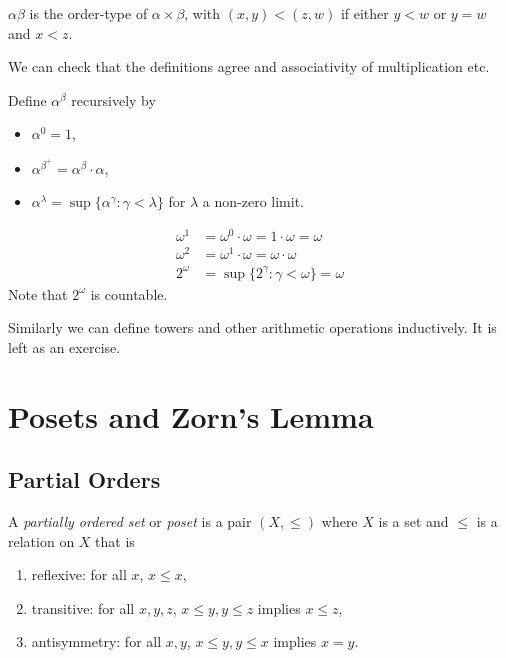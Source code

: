 \documentclass[a4paper]{article}
\begin{document}
\begin{definition}
  \(\alpha\beta\) is the order-type of \(\alpha \times \beta\), with \((x, y) < (z, w)\) if either \(y < w\) or \(y = w\) and \(x < z\).
\end{definition}

We can check that the definitions agree and associativity of multiplication etc.

\begin{definition}
  Define \(\alpha^\beta\) recursively by
  \begin{itemize}
  \item \(\alpha^0 = 1\),
  \item \(\alpha^{\beta^+} = \alpha^\beta \cdot \alpha\),
  \item \(\alpha^\lambda = \sup\{\alpha^\gamma: \gamma < \lambda\}\) for \(\lambda\) a non-zero limit.
  \end{itemize}
\end{definition}

\begin{eg}
  \begin{align*}
    \omega^1 &= \omega^0 \cdot \omega = 1 \cdot \omega = \omega \\
    \omega^2 &= \omega^1 \cdot \omega = \omega \cdot \omega \\
    2^\omega &= \sup\{2^\gamma: \gamma < \omega\} = \omega
  \end{align*}
  Note that \(2^\omega\) is countable.
\end{eg}

Similarly we can define towers and other arithmetic operations inductively. It is left as an exercise.

\section{Posets and Zorn's Lemma}

\subsection{Partial Orders}

\begin{definition}[Poset]
  A \emph{partially ordered set} or \emph{poset} is a pair \((X, \leq)\) where \(X\) is a set and \(\leq\) is a relation on \(X\) that is
  \begin{enumerate}
  \item reflexive: for all \(x\), \(x \leq x\),
  \item transitive: for all \(x, y, z\), \(x \leq y, y \leq z\) implies \(x \leq z\),
  \item antisymmetry: for all \(x, y\), \(x \leq y, y \leq x\) implies \(x = y\).
  \end{enumerate}
\end{definition}
\end{document}
